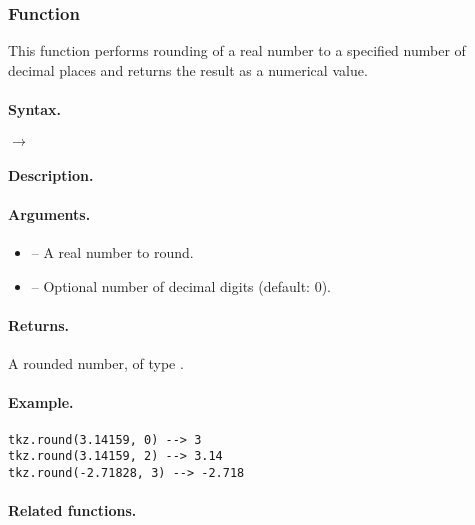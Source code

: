 

\subsubsection{Function } %
\label{ssub:function_tkz_round}

This function performs rounding of a real number to a specified number of decimal places and returns the result as a numerical value.

\paragraph{Syntax.}
\begin{center}
 \hspace{4em} $\rightarrow$ 
\end{center}

\paragraph{Description.}


\paragraph{Arguments.}
\begin{itemize}
\item {} – A real number to round.
\item {} – Optional number of decimal digits (default: 0).
\end{itemize}

\paragraph{Returns.}
A rounded number, of type .

\paragraph{Example.}
\begin{verbatim}
tkz.round(3.14159, 0) --> 3
tkz.round(3.14159, 2) --> 3.14
tkz.round(-2.71828, 3) --> -2.718
\end{verbatim}

\paragraph{Related functions.}

